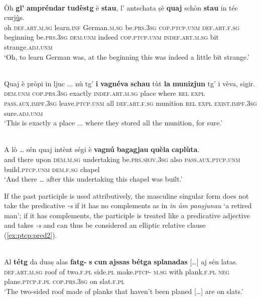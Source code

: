 \ea\label{ex:ptcp:agr2}
\\
\gll    Òh \textbf{gl’} \textbf{ampréndar} \textbf{tudèstg} è \textbf{stau}, l’ antschata ṣè \textbf{quaj} schòn \textbf{stau} in téc curj\underline{ù}s.\\
oh \textsc{def.art.m.sg} learn.\textsc{inf} German.\textsc{m.sg} be.\textsc{prs.3sg}  \textsc{cop.ptcp.unm} \textsc{def.art.f.sg} beginning be.\textsc{prs.3sg} \textsc{dem.unm} indeed \textsc{cop.ptcp.unm} \textsc{indef.art.m.sg} bit strange.\textsc{adj.unm}\\
\glt `Oh, to learn German was, at the beginning this was indeed a little bit strange.'
\z

\ea\label{ex:ptcp:agr3}
\\
\gll  Quaj è pròpi in ljuc ... nù tg’ \textbf{i} \textbf{vagnéva} \textbf{schau} tùt \textbf{la} \textbf{munizjun} tg’ i vèva, sigir.\\
\textsc{dem.unm} \textsc{cop.prs.3sg} exactly \textsc{indef.art.m.sg} place {} where \textsc{rel} \textsc{expl} \textsc{pass.aux.impf.3sg} leave.\textsc{ptcp.unm} all \textsc{def.art.f.sg} munition \textsc{rel} \textsc{expl} \textsc{exist.impf.3sg} sure.\textsc{adj.unm}\\
\glt `This is exactly a place ... where they stored all the munition, for sure.'
\z

\ea\label{ex:ptcp:agr5}
\\
\gll    A lò … sén quaj intènt ségi è \textbf{vagnú} \textbf{bagagjau} \textbf{quèla} \textbf{caplùta}.\\
and there {} upon \textsc{dem.m.sg} undertaking be.\textsc{prs.sbjv.3sg} also \textsc{pass.aux.ptcp.unm} build.\textsc{ptcp.unm} \textsc{dem.f.sg} chapel \\
\glt `And there … after this undertaking this chapel was built.'
\z


If the past participle is used attributively, the masculine singular form does not take the predicative \textit{-s} if it has no complements as in \textit{in ùm panṣjunau} `a retired man'; if it has complements, the participle is treated like a predicative adjective and takes \textit{-s} and can thus be considered an elliptic relative clause (\ref{ex:ptcp:pred2}).

\ea\label{ex:ptcp:pred2}
\\
\gll  Al \textbf{tétg} da duaṣ alas \textbf{fatg-} \textbf{s} \textbf{cun} \textbf{ajssas} \textbf{bétga} \textbf{splanadas} […] aj sén latas.\\
\textsc{def.art.m.sg} roof of two.\textsc{f.pl} side.\textsc{pl} make.\textsc{ptcp-} \textsc{m.sg} with plank.\textsc{f.pl} \textsc{neg}  plane.\textsc{ptcp.f.pl} {} \textsc{cop.prs.3sg} on slat.\textsc{f.pl}\\
\glt `The two-sided roof made of planks that haven't been planed […] are on slats.'
\z

